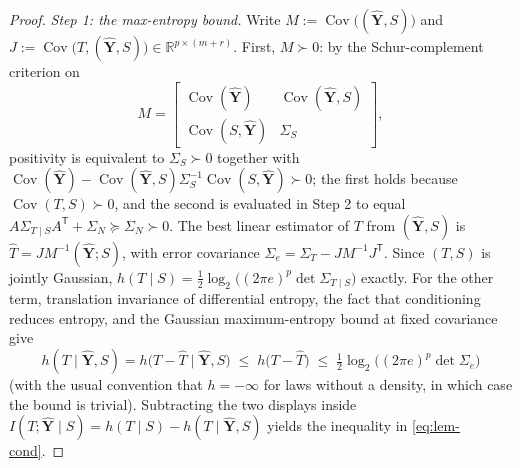 \documentclass[11pt,onecolumn]{IEEEtran}
\newcommand{\R}{\mathbb{R}}
\newcommand{\Cov}{\operatorname{Cov}}
\begin{document}
\begin{proof}
\emph{Step 1: the max-entropy bound.} Write
$M:=\Cov\bigl((\hat{\mathbf Y},S)\bigr)$ and
$J:=\Cov\bigl(T,(\hat{\mathbf Y},S)\bigr)\in\R^{p\times(m+r)}$. First,
$M\succ0$: by the Schur-complement criterion on
\[
M=\begin{bmatrix}
\Cov(\hat{\mathbf Y})&\Cov(\hat{\mathbf Y},S)\\[2pt]
\Cov(S,\hat{\mathbf Y})&\Sigma_S
\end{bmatrix},
\]
positivity is equivalent to $\Sigma_S\succ0$ together with
$\Cov(\hat{\mathbf Y})-\Cov(\hat{\mathbf Y},S)\Sigma_S^{-1}
\Cov(S,\hat{\mathbf Y})\succ0$; the first holds because
$\Cov(T,S)\succ0$, and the second is evaluated in Step 2 to equal
$A\Sigma_{T\mid S}A^{\mathsf T}+\Sigma_N\succeq\Sigma_N\succ0$. The best
linear estimator of $T$ from $(\hat{\mathbf Y},S)$ is
$\widehat T=JM^{-1}(\hat{\mathbf Y};S)$, with error covariance
$\Sigma_e=\Sigma_T-JM^{-1}J^{\mathsf T}$. Since $(T,S)$ is jointly
Gaussian,
$h(T\mid S)=\tfrac12\log_2\bigl((2\pi e)^p\det\Sigma_{T\mid S}\bigr)$
exactly. For the other term, translation invariance of differential
entropy, the fact that conditioning reduces entropy, and the Gaussian maximum-entropy
bound at fixed covariance give
\[
h(T\mid\hat{\mathbf Y},S)
=h\bigl(T-\widehat T\;\big|\;\hat{\mathbf Y},S\bigr)
\;\le\;h\bigl(T-\widehat T\bigr)
\;\le\;\tfrac12\log_2\bigl((2\pi e)^p\det\Sigma_e\bigr)
\]
(with the usual convention that $h=-\infty$ for laws without a
density, in which case the bound is trivial).
Subtracting the two displays inside
$I(T;\hat{\mathbf Y}\mid S)=h(T\mid S)-h(T\mid\hat{\mathbf Y},S)$
yields the inequality in \eqref{eq:lem-cond}.


\end{proof}
\end{document}
